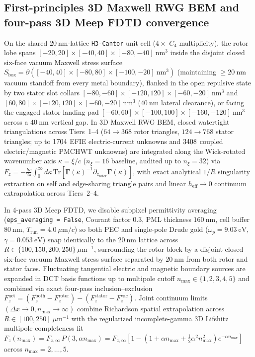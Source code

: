 \documentclass[pdflatex,sn-nature]{sn-jnl}
\begin{document}
\subsection*{First-principles 3D Maxwell RWG BEM and four-pass 3D Meep FDTD convergence}
On the shared $20\ \mathrm{nm}$-lattice \texttt{H3-Cantor} unit cell ($4\times$ $C_4$ multiplicity), the rotor lobe spans $[-20,20]\times[-40,40]\times[-80,-40]\ \mathrm{nm}^3$ inside the disjoint closed six-face vacuum Maxwell stress surface $S_{\mathrm{box}} = \partial([-40,40]\times[-80,80]\times[-100,-20]\ \mathrm{nm}^3)$ (maintaining $\ge 20\ \mathrm{nm}$ vacuum standoff from every metal boundary), flanked in the open repulsive state by two stator slot collars $[-80,-60]\times[-120,120]\times[-60,-20]\ \mathrm{nm}^3$ and $[60,80]\times[-120,120]\times[-60,-20]\ \mathrm{nm}^3$ ($40\ \mathrm{nm}$ lateral clearance), or facing the engaged stator landing pad $[-60,60]\times[-100,100]\times[-160,-120]\ \mathrm{nm}^3$ across a $40\ \mathrm{nm}$ vertical gap. In 3D Maxwell RWG BEM\cite{rao1982,reid2013pra}, closed watertight triangulations across Tiers~1--4 ($64 \to 368$ rotor triangles, $124 \to 768$ stator triangles; up to $1704{}$ EFIE electric-current unknowns and $3408{}$ coupled electric/magnetic PMCHWT unknowns) are integrated along the Wick-rotated wavenumber axis $\kappa = \xi/c$ ($n_\xi = 16$ baseline, audited up to $n_\xi = 32$) via $F_z = -\frac{\hbar c}{2\pi}\int_0^\infty d\kappa\,\mathrm{Tr}[\mathbf{\Gamma}(\kappa)^{-1}\partial_{z_{\mathrm{rotor}}}\mathbf{\Gamma}(\kappa)]$, with exact analytical $1/R$ singularity extraction on self and edge-sharing triangle pairs and linear $h_{\mathrm{eff}} \to 0$ continuum extrapolation across Tiers~2--4.

In 4-pass 3D Meep FDTD\cite{rodriguez2009pra,oskooi2010}, we disable subpixel permittivity averaging (\texttt{eps\_averaging = False}, Courant factor $0.3$, PML thickness $160\ \mathrm{nm}$, cell buffer $80\ \mathrm{nm}$, $T_{\mathrm{run}} = 4.0\ \mu\mathrm{m}/c$) so both PEC and single-pole Drude gold ($\omega_p = 9.03\ \mathrm{eV}$, $\gamma = 0.053\ \mathrm{eV}$) snap identically to the $20\ \mathrm{nm}$ lattice across $R \in \{100,150,200,250\}\ \mu\mathrm{m}^{-1}$, surrounding the rotor block by a disjoint closed six-face vacuum Maxwell stress surface separated by $20\ \mathrm{nm}$ from both rotor and stator faces. Fluctuating tangential electric and magnetic boundary sources are expanded in DCT basis functions up to multipole cutoff $n_{\max} \in \{1,2,3,4,5\}$ and combined via exact four-pass inclusion--exclusion $F_z^{\mathrm{net}} = (F_z^{\mathrm{both}} - F_z^{\mathrm{rotor}}) - (F_z^{\mathrm{stator}} - F_z^{\mathrm{vac}})$. Joint continuum limits $(\Delta x \to 0, n_{\max}\to\infty)$ combine Richardson spatial extrapolation across $R \in [100,250]\ \mu\mathrm{m}^{-1}$ with the regularized incomplete-gamma 3D Lifshitz multipole completeness fit $F_z(n_{\max}) = F_{z,\infty}\,P(3,\alpha n_{\max}) = F_{z,\infty}[1 - (1 + \alpha n_{\max} + \frac{1}{2}\alpha^2 n_{\max}^2)e^{-\alpha n_{\max}}]$ across $n_{\max}=2,\dots,5$.
\end{document}
